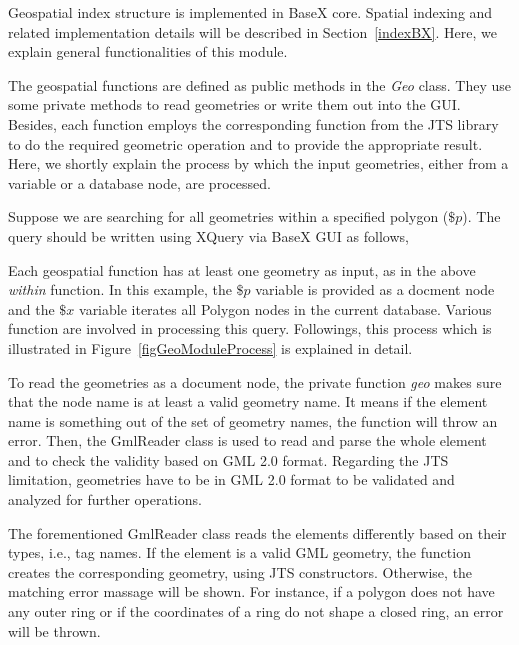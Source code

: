 \documentclass[a4paper,12pt]{article}
\begin{document}
Geospatial index structure is implemented in BaseX core. Spatial indexing and related implementation details will be described in Section~\ref{indexBX}. Here, we explain general functionalities of this module.

The geospatial functions are defined as public methods in the \textit{Geo} class. They use some private methods to read geometries or write them out into the GUI. Besides, each function employs the corresponding function from the JTS library to do the required geometric operation and to provide the appropriate result. Here, we shortly explain the process by which the input geometries, either from a variable or a database node, are processed.


Suppose we are searching for all geometries within a specified polygon ($\$p$). The query should be written using XQuery via BaseX GUI as follows,
\vspace{10px}
\vspace{10px}
Each geospatial function has at least one geometry as input, as in the above \textit{within} function. In this example, the $\$p$ variable is provided as a docment node and the $\$x$ variable iterates all Polygon nodes in the current database. Various function are involved in processing this query. Followings, this process which is illustrated in Figure~\ref{figGeoModuleProcess} is explained in detail. 

To read the geometries as a document node, the private function \textit{geo} makes sure that the node name is at least a valid geometry name. It means if the element name is something out of the set of geometry names, the function will throw an error. 
Then, the GmlReader class is used to read and parse the whole element and to check the validity based on GML 2.0 format. Regarding the JTS limitation, geometries have to be in GML 2.0 format to be validated and analyzed for further operations. 

The forementioned GmlReader class reads the elements differently based on their types, i.e., tag names. If the element is a valid GML geometry, the function creates the corresponding geometry, using JTS constructors. Otherwise, the matching error massage will be shown. For instance, if a polygon does not have any outer ring or if the coordinates of a ring do not shape a closed ring, an error will be thrown. 
\end{document}
